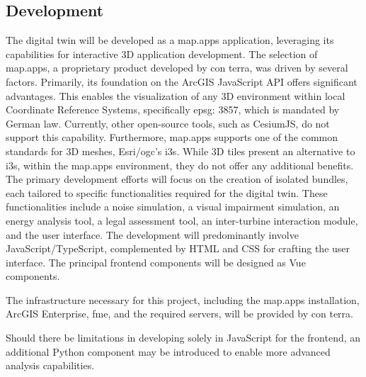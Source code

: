 \documentclass[11pt, titlepage, a4paper]{scrartcl}
\begin{document}
\begin{linenumbers}
\subsection{Development}
The digital twin will be developed as a map.apps application, leveraging its capabilities for interactive 3D application development. The selection of map.apps, a proprietary product developed by con terra, was driven by several factors. Primarily, its foundation on the ArcGIS JavaScript API offers significant advantages. This  enables the visualization of any 3D environment within local Coordinate Reference Systems, specifically \gls{epsg}: 3857, which is mandated by German law. Currently, other open-source tools, such as CesiumJS, do not support this capability. Furthermore, map.apps supports one of the common standards for 3D meshes, Esri/\gls{ogc}'s \gls{i3s}. While 3D tiles present an alternative to \gls{i3s}, within the map.apps environment, they do not offer any additional benefits. The primary development efforts will focus on the creation of isolated bundles, each tailored to specific functionalities required for the digital twin. These functionalities include a noise simulation, a visual impairment simulation, an energy analysis tool, a legal assessment tool, an inter-turbine interaction module, and the user interface. The development will predominantly involve JavaScript/TypeScript, complemented by HTML and CSS for crafting the user interface. The principal frontend components will be designed as Vue components.

The infrastructure necessary for this project, including the map.apps installation, ArcGIS Enterprise, \gls{fme}, and the required servers, will be provided by con terra.

Should there be limitations in developing solely in JavaScript for the frontend, an additional Python component may be introduced to enable more advanced analysis capabilities.



\end{linenumbers}
\end{document}
